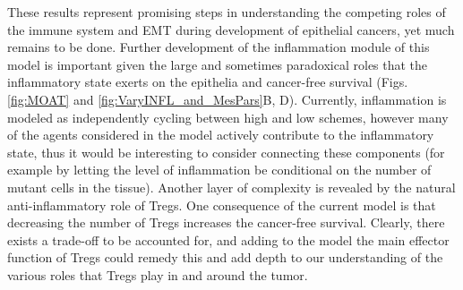 \documentclass[11pt]{article}
\begin{document}
These results represent promising steps in understanding the competing roles of the immune system and EMT during development of epithelial cancers, yet much remains to be done. Further development of the inflammation module of this model is important given the large and sometimes paradoxical roles that the inflammatory state exerts on the epithelia and cancer-free survival (Figs. \ref{fig:MOAT} and \ref{fig:VaryINFL_and_MesPars}B, D). Currently, inflammation is modeled as independently cycling between high and low schemes, however many of the agents considered in the model actively contribute to the inflammatory state, thus it would be interesting to consider connecting these components (for example by letting the level of inflammation be conditional on the number of mutant cells in the tissue). Another layer of complexity is revealed by the natural anti-inflammatory role of Tregs. One consequence of the current model is that decreasing the number of Tregs increases the cancer-free survival. Clearly, there exists a trade-off to be accounted for, and adding to the model the main effector function of Tregs could remedy this and add depth to our understanding of the various roles that Tregs play in and around the tumor.
\end{document}
